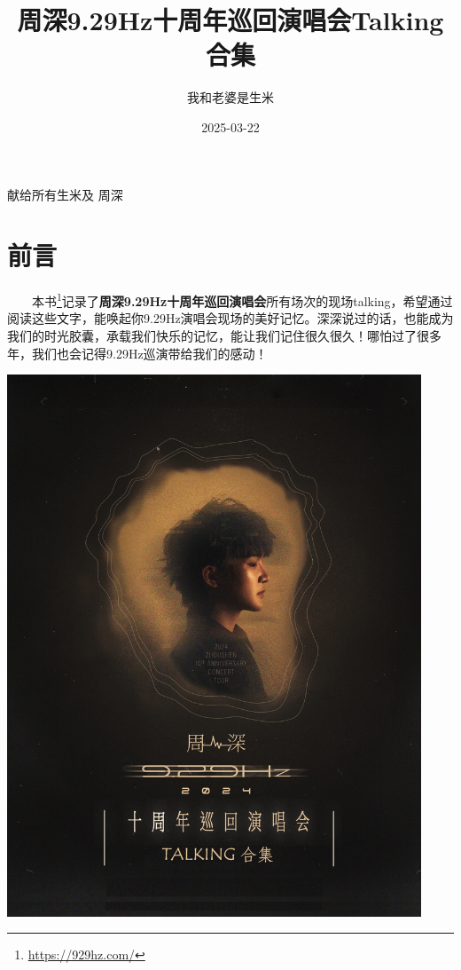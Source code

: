 \documentclass[]{ctexbook}
\title{周深9.29Hz十周年巡回演唱会Talking合集}
\author{我和老婆是生米}
\date{2025-03-22}
\renewcommand{\href}[2]{#2\footnote{\url{#1}}}
\begin{document}
\maketitle


\thispagestyle{empty}

\begin{center}
献给所有生米及
          周深
\end{center}

\setlength{\abovedisplayskip}{-5pt}
\setlength{\abovedisplayshortskip}{-5pt}

\mainmatter

{
\setcounter{tocdepth}{2}
\tableofcontents
}
\listoftables
\listoffigures
\chapter*{前言}\label{ux524dux8a00}


  \href{https://929hz.com/}{本书}记录了\textbf{周深9.29Hz十周年巡回演唱会}所有场次的现场talking，希望通过阅读这些文字，能唤起你9.29Hz演唱会现场的美好记忆。深深说过的话，也能成为我们的时光胶囊，承载我们快乐的记忆，能让我们记住很久很久！哪怕过了很多年，我们也会记得9.29Hz巡演带给我们的感动！

\begin{center}\includegraphics[width=350pt]{img/book-cover} \end{center}
\end{document}

